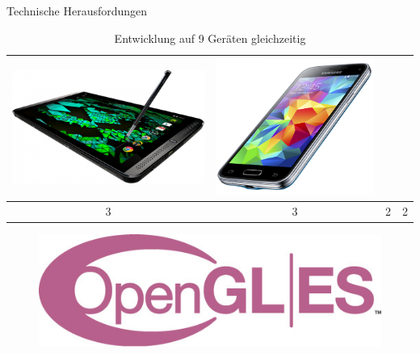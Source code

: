 \begin{frame}{Technische Herausfordungen}
{\begin{table}[h]
\begin{tabular}{c|c|c|c}
		\includegraphics[width=\textwidth, height=0.1\textheight, keepaspectratio]{images/tablets} & 
		\includegraphics[width=\textwidth, height=0.1\textheight, keepaspectratio]{images/smartphones} \\ \hline
		3 & 3 & 2 & 2
	\end{tabular}
	\caption{Entwicklung auf 9 Geräten gleichzeitig}
	\end{table}
}
{
	\begin{figure}
		\centering
		\includegraphics[width=\textwidth, height=0.18\textheight, keepaspectratio]{images/opengl_es_logo}

\end{figure}}
\end{frame}
